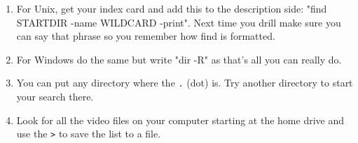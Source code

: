 \begin{enumerate}
\item For Unix, get your  index card and add this to the description side: "find STARTDIR -name WILDCARD -print".  Next time you drill make sure you can say that phrase so you remember how find is formatted.
\item For Windows do the same but write "dir -R" as that's all you can really do.
\item You can put any directory where the \verb|.| (dot) is.  Try another directory to start your search there.
\item Look for all the video files on your computer starting at the home drive and use the \verb|>| to save the list to a file.
\end{enumerate}

